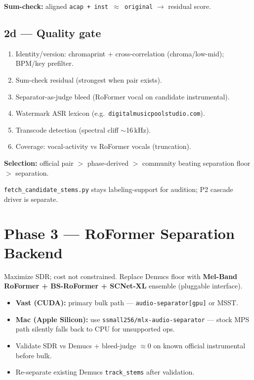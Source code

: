 \documentclass[11pt,a4paper]{article}
\begin{document}
\textbf{Sum-check:} aligned \texttt{acap + inst $\approx$ original} $\to$ residual score.

\subsection{2d --- Quality gate}

\begin{enumerate}[noitemsep]
  \item Identity/version: chromaprint + cross-correlation (chroma/low-mid); BPM/key prefilter.
  \item Sum-check residual (strongest when pair exists).
  \item Separator-as-judge bleed (RoFormer vocal on candidate instrumental).
  \item Watermark ASR lexicon (e.g.\ \texttt{digitalmusicpoolstudio.com}).
  \item Transcode detection (spectral cliff ${\sim}$16\,kHz).
  \item Coverage: vocal-activity vs RoFormer vocals (truncation).
\end{enumerate}

\textbf{Selection:} official pair $>$ phase-derived $>$ community beating separation floor $>$ separation.

\texttt{fetch\_candidate\_stems.py} stays labeling-support for audition; P2 cascade driver is separate.

\section{Phase 3 --- RoFormer Separation Backend}

Maximize SDR; cost not constrained. Replace Demucs floor with
\textbf{Mel-Band RoFormer + BS-RoFormer + SCNet-XL} ensemble (pluggable interface).

\begin{itemize}[noitemsep]
  \item \textbf{Vast (CUDA):} primary bulk path --- \texttt{audio-separator[gpu]} or MSST.
  \item \textbf{Mac (Apple Silicon):} use \texttt{ssmall256/mlx-audio-separator} --- stock
        MPS path silently falls back to CPU for unsupported ops.
  \item Validate SDR vs Demucs + bleed-judge ${\approx}0$ on known official instrumental before bulk.
  \item Re-separate existing Demucs \texttt{track\_stems} after validation.
\end{itemize}
\end{document}

